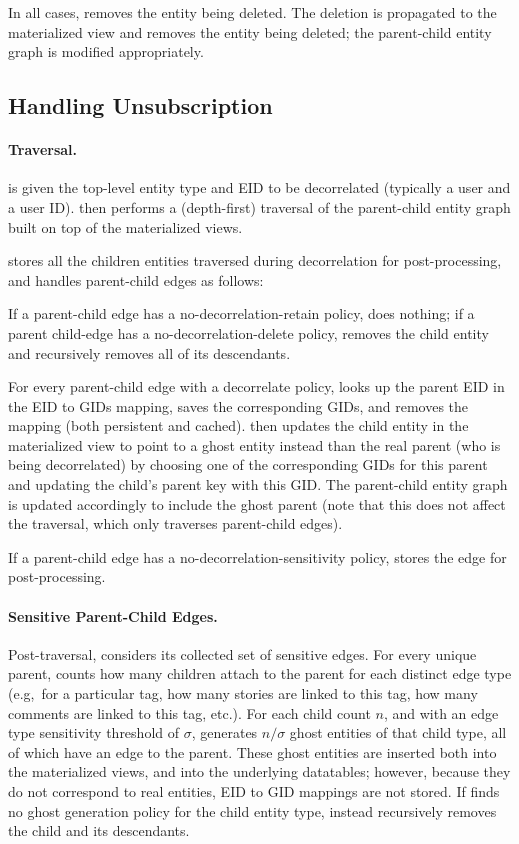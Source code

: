 In all cases, \sys removes the entity being deleted.
The deletion is propagated to the materialized view and removes the entity being deleted; the
parent-child entity graph is modified appropriately.

\subsection{Handling Unsubscription}
\paragraph{Traversal.}
\sys is given the top-level entity type and EID to be decorrelated (typically a user and a user ID).
\sys then performs a (depth-first) traversal of the parent-child entity graph built on top of the materialized
views. 

\sys stores all the children entities traversed during decorrelation for post-processing, and
handles parent-child edges as follows:

If a parent-child edge has a no-decorrelation-retain policy, \sys does nothing; if a parent child-edge has a
no-decorrelation-delete policy, \sys removes the child entity and recursively removes all of its
descendants. 

For every parent-child edge with a decorrelate policy, \sys looks up the parent EID in the
EID to GIDs mapping, saves the corresponding GIDs, and removes the mapping (both persistent and
cached).
\sys then updates the child entity in the materialized view to point to a ghost entity instead
than the real parent (who is being decorrelated) by choosing one of the corresponding GIDs for this
parent and updating the child's parent key with this GID.  The parent-child entity graph is updated
accordingly to include the ghost parent (note that this does not affect the traversal, which only
traverses parent-child edges).

If a parent-child edge has a no-decorrelation-sensitivity policy, \sys stores the edge for
post-processing.

\paragraph{Sensitive Parent-Child Edges.}
Post-traversal, \sys considers its collected set of sensitive edges. For every unique parent,
\sys counts how many children attach to the parent for each distinct edge type (e.g,\ for a
particular tag, how many stories are linked to this tag, how many comments are linked to this tag,
etc.). For each child count $n$, and with an edge type sensitivity threshold of $\sigma$, 
\sys generates $n / \sigma$ ghost entities of that child type, all of which have an edge to the parent.
These ghost entities are inserted both into the materialized views, and into the underlying
datatables; however, because they do not correspond to real entities, EID to GID mappings are not
stored. 
If \sys finds no ghost generation policy for the child entity type, \sys instead recursively
removes the child and its descendants.

